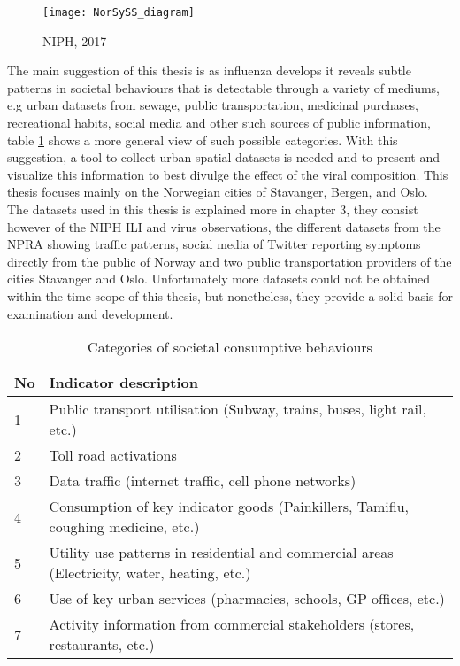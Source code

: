\begin{figure}[h]
\texttt{[image: NorSySS\_diagram]}
\centering
\caption{NIPH, 2017}
\label{fig:norsyss}
\end{figure}

The main suggestion of this thesis is as influenza develops it reveals subtle patterns in societal behaviours that is detectable through a variety of mediums, e.g urban datasets from sewage, public transportation, medicinal purchases, recreational habits, social media and other such sources of public information, table \ref{table:2} shows a more general view of such possible categories. With this suggestion, a tool to collect urban spatial datasets is needed and to present and visualize this information to best divulge the effect of the viral composition. This thesis focuses mainly on the Norwegian cities of Stavanger, Bergen, and Oslo. The datasets used in this thesis is explained more in chapter 3, they consist however of the NIPH ILI and virus observations, the different datasets from the NPRA showing traffic patterns, social media of Twitter reporting symptoms directly from the public of Norway and two public transportation providers of the cities Stavanger and Oslo. Unfortunately more datasets could not be obtained within the time-scope of this thesis, but nonetheless, they provide a solid basis for examination and development.


\begin{center}
\begin{table}
\begin{tabular}{ | m{2em} | m{14cm}| }
 \hline
 \textbf{No} & \textbf{Indicator description} \\ [0.5ex] 
 \hline
 1 & Public transport utilisation (Subway, trains, buses, light rail, etc.) \\ 
  \hline
 2 & Toll road activations \\
  \hline
 3 & Data traffic (internet traffic, cell phone networks) \\
  \hline
 4 & Consumption of key indicator goods (Painkillers, Tamiflu, coughing medicine, etc.) \\
  \hline
 5 & Utility use patterns in residential and commercial areas (Electricity, water, heating, etc.) \\
 \hline
 6 & Use of key urban services (pharmacies, schools, GP offices, etc.) \\  
 \hline
 7 & Activity information from commercial stakeholders (stores, restaurants, etc.) \\ 
 \hline
\end{tabular}
 \caption{Categories of societal consumptive behaviours}
 \label{table:2}
\end{table}
\end{center}

